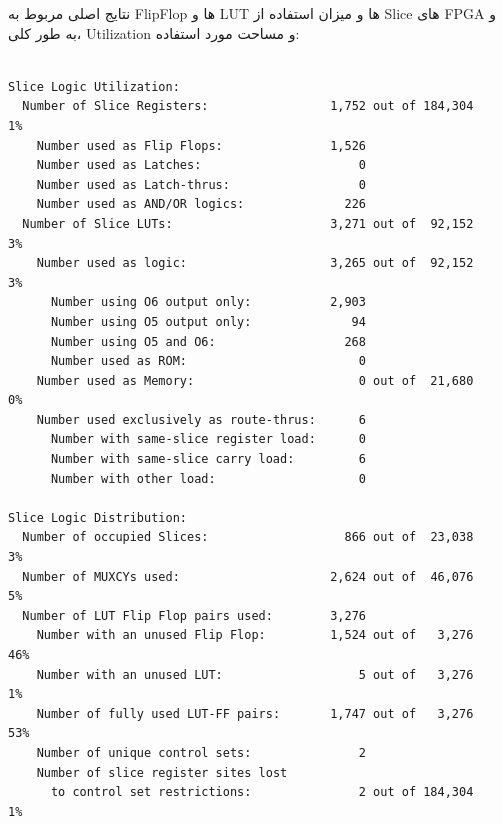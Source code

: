 \documentclass[12pt,titlepage,a4page , tikz , multi,table , svgnames,xcdraw]{article}
\begin{document}
نتایج اصلی مربوط به FlipFlop ها و LUT ها و میزان استفاده از Slice های FPGA و به طور کلی، Utilization و مساحت مورد استفاده:

\begin{latin}
\begin{verbatim}

Slice Logic Utilization:
  Number of Slice Registers:                 1,752 out of 184,304    1%
    Number used as Flip Flops:               1,526
    Number used as Latches:                      0
    Number used as Latch-thrus:                  0
    Number used as AND/OR logics:              226
  Number of Slice LUTs:                      3,271 out of  92,152    3%
    Number used as logic:                    3,265 out of  92,152    3%
      Number using O6 output only:           2,903
      Number using O5 output only:              94
      Number using O5 and O6:                  268
      Number used as ROM:                        0
    Number used as Memory:                       0 out of  21,680    0%
    Number used exclusively as route-thrus:      6
      Number with same-slice register load:      0
      Number with same-slice carry load:         6
      Number with other load:                    0

Slice Logic Distribution:
  Number of occupied Slices:                   866 out of  23,038    3%
  Number of MUXCYs used:                     2,624 out of  46,076    5%
  Number of LUT Flip Flop pairs used:        3,276
    Number with an unused Flip Flop:         1,524 out of   3,276   46%
    Number with an unused LUT:                   5 out of   3,276    1%
    Number of fully used LUT-FF pairs:       1,747 out of   3,276   53%
    Number of unique control sets:               2
    Number of slice register sites lost
      to control set restrictions:               2 out of 184,304    1%


\end{verbatim}
\end{latin}



\newpage
\medskip




\end{document}
